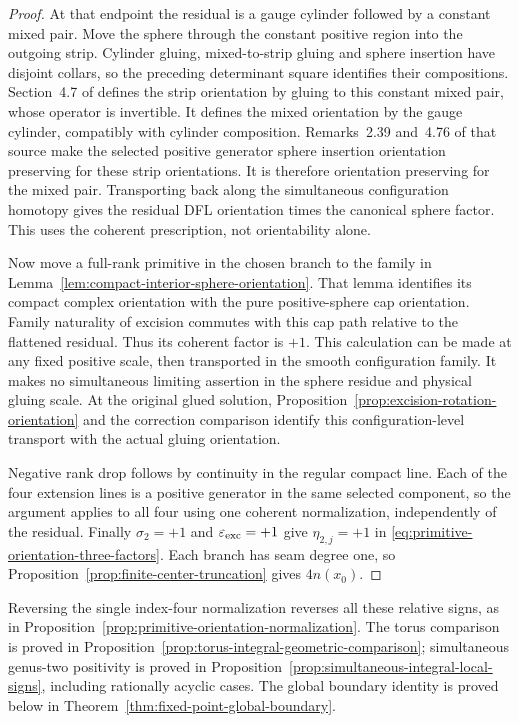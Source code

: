 \documentclass[11pt]{amsart}
\theoremstyle{definition}
\theoremstyle{remark}
\theoremstyle{plain}
\begin{document}
\begin{proof}
At that endpoint the residual is a gauge
cylinder followed by a constant mixed pair.
Move the sphere through the constant positive
region into the outgoing strip. Cylinder gluing,
mixed-to-strip gluing and sphere insertion have
disjoint collars, so the preceding determinant
square identifies their compositions.
Section~4.7 of \cite{DaeFukLip21a} defines the
strip orientation by gluing to this constant
mixed pair, whose operator is invertible.
It defines the mixed orientation by the gauge
cylinder, compatibly with cylinder composition.
Remarks~2.39 and~4.76 of that source make the
selected positive generator sphere insertion
orientation preserving for these strip
orientations. It is therefore orientation
preserving for the mixed pair. Transporting
back along the simultaneous configuration
homotopy gives the residual DFL orientation
times the canonical sphere factor. This uses
the coherent prescription, not orientability alone.

Now move a full-rank primitive in the chosen
branch to the family in
Lemma~\ref{lem:compact-interior-sphere-orientation}.
That lemma identifies its compact complex
orientation with the pure positive-sphere cap
orientation. Family naturality of excision
commutes with this cap path relative to the
flattened residual. Thus its coherent factor
is $+1$. This calculation can be made at any
fixed positive scale, then transported in the
smooth configuration family. It makes no
simultaneous limiting assertion in the sphere
residue and physical gluing scale. At the
original glued solution,
Proposition~\ref{prop:excision-rotation-orientation}
and the correction comparison identify this
configuration-level transport with the actual
gluing orientation.

Negative rank drop follows by continuity in
the regular compact line. Each of the four
extension lines is a positive generator in
the same selected component, so the argument
applies to all four using one coherent
normalization, independently of the residual.
Finally $\sigma_2=+1$ and
$\varepsilon_{\rm exc}=+1$ give
$\eta_{2,j}=+1$ in
\eqref{eq:primitive-orientation-three-factors}.
Each branch has seam degree one, so
Proposition~\ref{prop:finite-center-truncation}
gives $4n(x_0)$.
\end{proof}

Reversing the single index-four normalization
reverses all these relative signs, as in
Proposition~\ref{prop:primitive-orientation-normalization}.
The torus comparison is proved in
Proposition~\ref{prop:torus-integral-geometric-comparison};
simultaneous genus-two positivity is proved in
Proposition~\ref{prop:simultaneous-integral-local-signs},
including rationally acyclic cases. The global
boundary identity is proved below in
Theorem~\ref{thm:fixed-point-global-boundary}.
\end{document}
